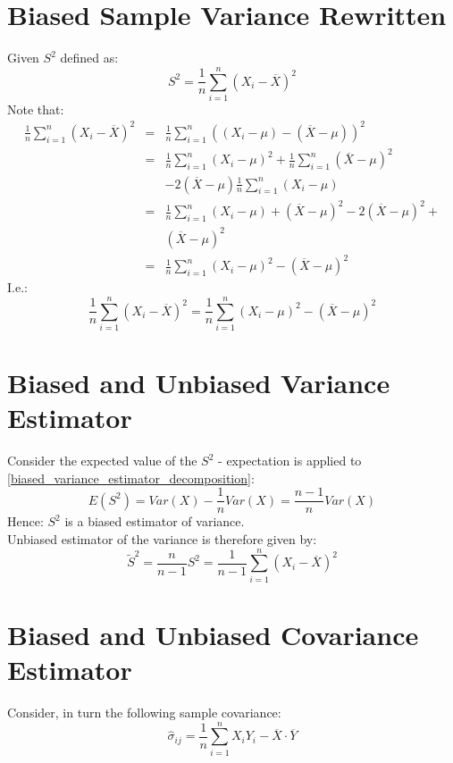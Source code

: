 \documentclass[12pt]{article}
\begin{document}
\section{Biased Sample Variance Rewritten}
Given $S^2$ defined as:
\begin{equation}
\label{biased_variance_estimator}
S^2 = \frac{1}{n}\sum_{i=1}^{n} (X_i - \overline{X})^2
\end{equation}
Note that:
\begin{eqnarray*}
\frac{1}{n}\sum_{i=1}^{n} (X_i - \overline{X})^2 &=& 
\frac{1}{n}\sum_{i=1}^{n}\left( 
(X_i - \mu) - (\overline{X} - \mu)
\right)^2 \\
&=& \frac{1}{n} \sum_{i=1}^{n}(X_i - \mu)^2 + 
\frac{1}{n} \sum_{i=1}^{n}(\overline{X} - \mu)^2 \\
&& - 2 (\overline{X} - \mu) \frac{1}{n} \sum_{i=1}^{n} (X_i - \mu) \\
&=& \frac{1}{n} \sum_{i=1}^{n}(X_i - \mu) + (\overline{X} - \mu)^2 
- 2 (\overline{X} - \mu)^2 + \\ && (\overline{X} - \mu)^2 \\
&=& \frac{1}{n} \sum_{i=1}^{n} (X_i - \mu)^2 - (\overline{X} - \mu)^2
\end{eqnarray*}
I.e.:
\begin{equation}
\label{biased_variance_estimator_decomposition}
\frac{1}{n} \sum_{i=1}^{n} (X_i - \overline{X})^2 = 
\frac{1}{n} \sum_{i=1}^{n} (X_i - \mu)^2 - (\overline{X} - \mu)^2
\end{equation}



\section{Biased and Unbiased Variance Estimator}
Consider the expected value of the $S^2$ - expectation is applied to 
\ref{biased_variance_estimator_decomposition}:
\begin{equation*}
E(S^2) = Var(X) - \frac{1}{n} Var(X) = \frac{n-1}{n} Var(X)
\end{equation*}
Hence: $S^2$ is a biased estimator of variance.\\
Unbiased estimator of the variance is therefore given by:
\begin{equation*}
\tilde{S}^2 = \frac{n}{n-1} S^2 = 
\frac{1}{n-1} \sum_{i=1}^{n} (X_i - \overline{X})^2
\end{equation*}

\section{Biased and Unbiased Covariance Estimator}
Consider, in turn the following sample covariance:
\begin{equation*}
\hat{\sigma}_{ij} = \frac{1}{n} \sum_{i=1}^{n}X_i Y_i - \overline{X} \cdot \overline{Y}
\end{equation*}
\end{document}
